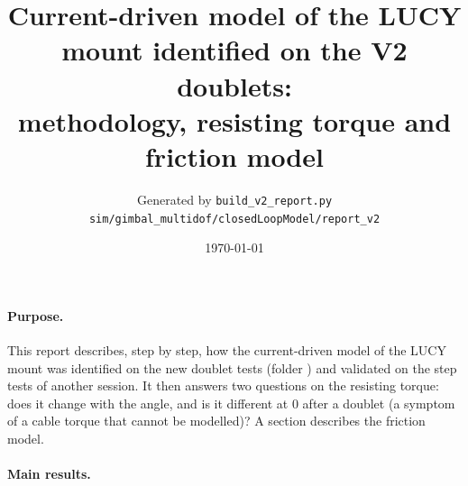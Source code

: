 \documentclass[10pt,a4paper]{article}
\title{Current-driven model of the LUCY mount identified on the V2 doublets:\\ methodology, resisting torque and friction model}
\author{Generated by \texttt{build\_v2\_report.py}\\ \small\texttt{sim/gimbal\_multidof/closedLoopModel/report\_v2}}
\date{\today}
\numberwithin{equation}{section}
\begin{document}
\maketitle

\paragraph{Purpose.} This report describes, step by step, how the current-driven model of the LUCY mount was identified on the new doublet tests (folder ) and validated on the step tests of another session. It then answers two questions on the resisting torque: does it change with the angle, and is it different at 0 after a doublet (a symptom of a cable torque that cannot be modelled)? A section describes the friction model.

\paragraph{Main results.}
\end{document}
